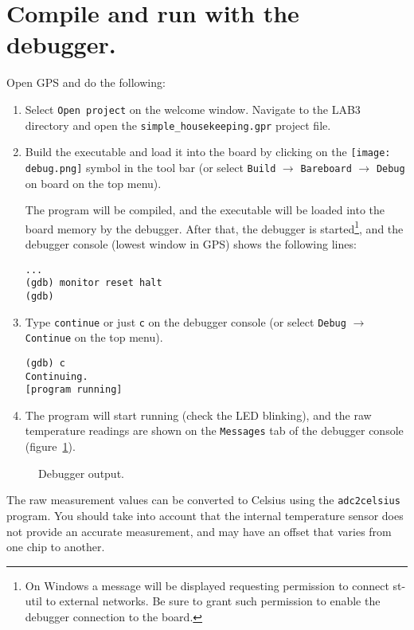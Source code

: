 \section{Compile and run with the debugger.}

Open GPS and do the following:
\begin{enumerate}
\item Select {\tt Open project} on the welcome window. Navigate to the LAB3 directory and open the {\tt simple\_housekeeping.gpr} project file.
\item Build the executable and load it into the board by clicking on the \hbox{\texttt{[image: debug.png]}} symbol in the tool bar (or select {\tt Build} $\rightarrow$ {\tt Bareboard} $\rightarrow$ {\tt Debug} on board on the top menu).

The program will be compiled, and the executable will be loaded into the board memory by the debugger. After that, the debugger is started\footnote{On Windows a message will be displayed requesting permission to connect st-util to external networks. Be sure to grant such permission to enable the debugger connection to the board.}, and the debugger console (lowest window in GPS) shows the following lines:
\begin{verbatim}
...
(gdb) monitor reset halt
(gdb)
\end{verbatim}

\item Type {\tt continue} or just {\tt c} on the debugger console (or select {\tt Debug} $\rightarrow$ {\tt Continue} on the top menu).
\begin{verbatim}
(gdb) c
Continuing.
[program running]
\end{verbatim}

\item The program will start running (check the LED blinking), and the raw temperature readings are shown on the {\tt Messages} tab of the debugger console (figure~\ref{fig:gdb-output}).
\end{enumerate}

\begin{figure}[h]
            \caption{Debugger output.}
            \label{fig:gdb-output}
\end{figure}

The raw measurement values can be converted to Celsius using the {\tt adc2celsius} program. You should take into account that the internal temperature sensor does not provide an accurate measurement, and may have an offset that varies from one chip to another.


